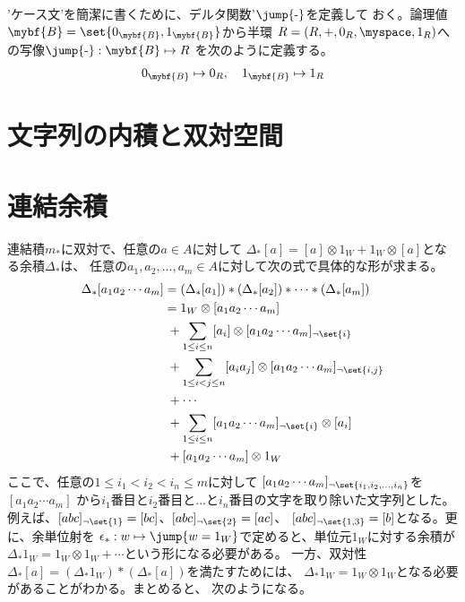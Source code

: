 	'ケース文'を簡潔に書くために、デルタ関数'$\jump{\mathchar`-}$を定義して
	おく。論理値$\mybf{B}=\set{0_{\mybf{B}},1_{\mybf{B}}}$から半環
	$R=(R,+,0_R,\myspace,1_R)$への写像$\jump{\mathchar`-}:\mybf{B}\mapsto R$
	を次のように定義する。
	\begin{equation*}\begin{split} %
		0_{\mybf{B}}\mapsto 0_R,\quad 1_{\mybf{B}}\mapsto 1_R
	\end{split}\end{equation*} %

\section{文字列の内積と双対空間}\label{s1:文字列の内積と双対空間} %

\section{連結余積}\label{s:連結余積} %
	連結積$m_*$に双対で、任意の$a\in A$に対して
	$\Delta_*[a]=[a]\otimes 1_W+1_W\otimes [a]$となる余積$\Delta_*$は、
	任意の$a_1,a_2,\dots,a_m\in A$に対して次の式で具体的な形が求まる。
	\begin{equation}\begin{split} %
		\Delta_*[a_1a_2\cdots a_m] 
		&= (\Delta_*[a_1])*(\Delta_*[a_2])*\cdots*(\Delta_*[a_m]) \\
		&= 1_W\otimes [a_1a_2\cdots a_m] \\
		&\;+ \sum_{1\le i\le n}[a_i]\otimes [a_1a_2\cdots a_m]_{\neg\set{i}} \\
		&\;+ \sum_{1\le i<j\le n}[a_ia_j]
			\otimes [a_1a_2\cdots a_m]_{\neg\set{i,j}} \\
		&\;+ \cdots \\
		&\;+ \sum_{1\le i\le n}[a_1a_2\cdots a_m]_{\neg\set{i}}\otimes [a_i] \\
		&\;+ [a_1a_2\cdots a_m]\otimes 1_W \\
	\end{split}\end{equation} %
	ここで、任意の$1\le i_1<i_2<i_n\le m$に対して
	$[a_1a_2\cdots a_m]_{\neg\set{i_1,i_2,\dots,i_n}}$を$[a_1a_2\cdots a_m]$
	から$i_1$番目と$i_2$番目と...と$i_n$番目の文字を取り除いた文字列とした。
	例えば、$[abc]_{\neg\set{1}}=[bc]$、$[abc]_{\neg\set{2}}=[ac]$、
	$[abc]_{\neg\set{1,3}}=[b]$となる。更に、余単位射を
	$\epsilon_*:w\mapsto \jump{w=1_W}$で定めると、単位元$1_W$に対する余積が
	$\Delta_*1_W=1_W\otimes 1_W+\cdots$という形になる必要がある。
	一方、双対性$\Delta_*[a]=(\Delta_*1_W)*(\Delta_*[a])$を満たすためには、
	$\Delta_*1_W=1_W\otimes 1_W$となる必要があることがわかる。まとめると、
	次のようになる。

